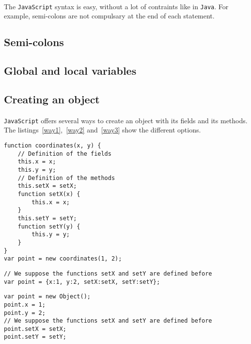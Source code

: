 
\paragraph{}
The \texttt{JavaScript} syntax is easy, without a lot of contraints like in \texttt{Java}. For example, semi-colons are not compulsary at the end of each statement.

\subsection{Semi-colons}

\subsection{Global and local variables}

\subsection{Creating an object}
\paragraph{}
\texttt{JavaScript} offers several ways to create an object with its fields and its methods. The listings~\ref{way1},~\ref{way2} and~\ref{way3} show the different options.
        
\begin{lstlisting}[caption={Creating an object with a constructor}, label={way1}]
function coordinates(x, y) {
    // Definition of the fields
    this.x = x;
    this.y = y;
    // Definition of the methods
    this.setX = setX;
    function setX(x) {
        this.x = x;
    }
    this.setY = setY;
    function setY(y) {
        this.y = y;
    }
}
var point = new coordinates(1, 2);
\end{lstlisting}
        
\begin{lstlisting}[caption=Creating an object with the "C-structure" syntax, label={way2}]
// We suppose the functions setX and setY are defined before
var point = {x:1, y:2, setX:setX, setY:setY};
\end{lstlisting}

\begin{lstlisting}[caption=Creating an object with the operator "new Object()", label={way3}]
var point = new Object();
point.x = 1;
point.y = 2;
// We suppose the functions setX and setY are defined before
point.setX = setX;
point.setY = setY;
\end{lstlisting}

